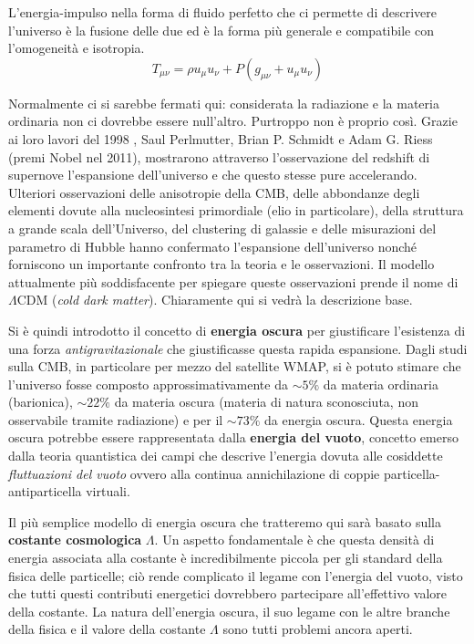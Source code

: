 L'energia-impulso nella forma di fluido perfetto che ci permette di descrivere l'universo è la fusione delle due ed è la forma più generale e compatibile con l'omogeneità e isotropia.
\begin{equation*}
    T_{\mu\nu} = \rho u_\mu u_\nu + P(g_{\mu\nu} +u_\mu u_\nu)
\end{equation*}

Normalmente ci si sarebbe fermati qui: considerata la radiazione e la materia ordinaria non ci dovrebbe essere null'altro. Purtroppo non è proprio così. Grazie ai loro lavori del 1998 \cite{1998_1} \cite{1998_2}, Saul Perlmutter, Brian P. Schmidt e Adam G. Riess (premi Nobel nel 2011), mostrarono attraverso l'osservazione del redshift di supernove l'espansione dell'universo e che questo stesse pure accelerando. Ulteriori osservazioni delle anisotropie della CMB, delle abbondanze degli elementi dovute alla nucleosintesi primordiale (elio in particolare), della struttura a grande scala dell'Universo, del clustering di galassie e delle misurazioni del parametro di Hubble hanno confermato l'espansione dell'universo nonché forniscono un importante confronto tra la teoria e le osservazioni. Il modello attualmente più soddisfacente per spiegare queste osservazioni prende il nome di $\Lambda$CDM (\emph{cold dark matter}). Chiaramente qui si vedrà la descrizione base.

Si è quindi introdotto il concetto di \textbf{energia oscura} per giustificare l'esistenza di una forza \emph{antigravitazionale} che giustificasse questa rapida espansione. Dagli studi sulla CMB, in particolare per mezzo del satellite WMAP, si è potuto stimare che l'universo fosse composto approssimativamente  da $\sim 5\%$ da materia ordinaria (barionica), $\sim 22\%$ da materia oscura (materia di natura sconosciuta, non osservabile tramite radiazione) e per il $\sim 73 \%$ da energia oscura. Questa energia oscura potrebbe essere rappresentata dalla \textbf{energia del vuoto}, concetto emerso dalla teoria quantistica dei campi che descrive l'energia dovuta alle cosiddette \emph{fluttuazioni del vuoto} ovvero alla continua annichilazione di coppie particella-antiparticella virtuali.

Il più semplice modello di energia oscura che tratteremo qui sarà basato sulla \textbf{costante cosmologica} $\Lambda$. Un aspetto fondamentale è che questa densità di energia associata alla costante è incredibilmente piccola per gli standard della fisica delle particelle; ciò rende complicato il legame con l'energia del vuoto, visto che tutti questi contributi energetici dovrebbero partecipare all'effettivo valore della costante. La natura dell'energia oscura, il suo legame con le altre branche della fisica e il valore della costante $\Lambda$ sono tutti problemi ancora aperti.

